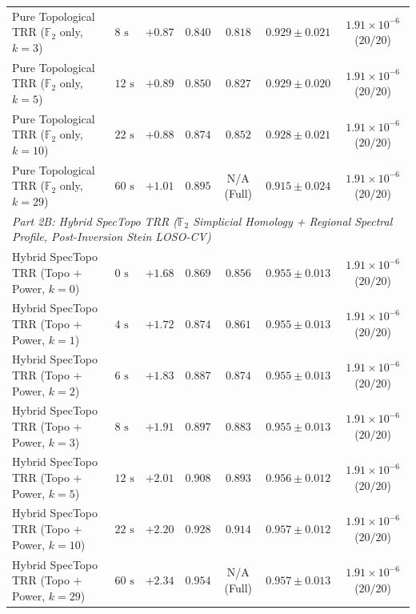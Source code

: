\documentclass[10pt,twocolumn]{article}
\begin{document}
\begin{table}[t]
{\begin{tabular}{llccccc}
Pure Topological TRR ($\mathbb{F}_2$ only, $k=3$) & $8\text{ s}$ & $+0.87$ & $\mathbf{0.840}$ & $\mathbf{0.818}$ & $\mathbf{0.929 \pm 0.021}$ & $1.91 \times 10^{-6}$ ($20/20$) \\
Pure Topological TRR ($\mathbb{F}_2$ only, $k=5$) & $12\text{ s}$ & $+0.89$ & $0.850$ & $0.827$ & $0.929 \pm 0.020$ & $1.91 \times 10^{-6}$ ($20/20$) \\
Pure Topological TRR ($\mathbb{F}_2$ only, $k=10$) & $22\text{ s}$ & $+0.88$ & $\mathbf{0.874}$ & $\mathbf{0.852}$ & $\mathbf{0.928 \pm 0.021}$ & $1.91 \times 10^{-6}$ ($20/20$) \\
Pure Topological TRR ($\mathbb{F}_2$ only, $k=29$) & $60\text{ s}$ & $+1.01$ & $\mathbf{0.895}$ & N/A (Full) & $0.915 \pm 0.024$ & $1.91 \times 10^{-6}$ ($20/20$) \\
\midrule
\multicolumn{7}{l}{\textit{Part 2B: Hybrid SpecTopo TRR ($\mathbb{F}_2$ Simplicial Homology + Regional Spectral Profile, Post-Inversion Stein LOSO-CV)}} \\
Hybrid SpecTopo TRR (Topo + Power, $k=0$) & $0\text{ s}$ & $+1.68$ & $\mathbf{0.869}$ & $\mathbf{0.856}$ & $\mathbf{0.955 \pm 0.013}$ & $1.91 \times 10^{-6}$ ($20/20$) \\
Hybrid SpecTopo TRR (Topo + Power, $k=1$) & $4\text{ s}$ & $+1.72$ & $0.874$ & $0.861$ & $0.955 \pm 0.013$ & $1.91 \times 10^{-6}$ ($20/20$) \\
Hybrid SpecTopo TRR (Topo + Power, $k=2$) & $6\text{ s}$ & $+1.83$ & $0.887$ & $0.874$ & $0.955 \pm 0.013$ & $1.91 \times 10^{-6}$ ($20/20$) \\
Hybrid SpecTopo TRR (Topo + Power, $k=3$) & $8\text{ s}$ & $+1.91$ & $\mathbf{0.897}$ & $\mathbf{0.883}$ & $\mathbf{0.955 \pm 0.013}$ & $1.91 \times 10^{-6}$ ($20/20$) \\
Hybrid SpecTopo TRR (Topo + Power, $k=5$) & $12\text{ s}$ & $+2.01$ & $0.908$ & $0.893$ & $0.956 \pm 0.012$ & $1.91 \times 10^{-6}$ ($20/20$) \\
Hybrid SpecTopo TRR (Topo + Power, $k=10$) & $22\text{ s}$ & $+2.20$ & $\mathbf{0.928}$ & $\mathbf{0.914}$ & $\mathbf{0.957 \pm 0.012}$ & $1.91 \times 10^{-6}$ ($20/20$) \\
Hybrid SpecTopo TRR (Topo + Power, $k=29$) & $60\text{ s}$ & $+2.34$ & $\mathbf{0.954}$ & N/A (Full) & $\mathbf{0.957 \pm 0.013}$ & $1.91 \times 10^{-6}$ ($20/20$) \\
\bottomrule
\end{tabular}
}
\end{table}
\end{document}
